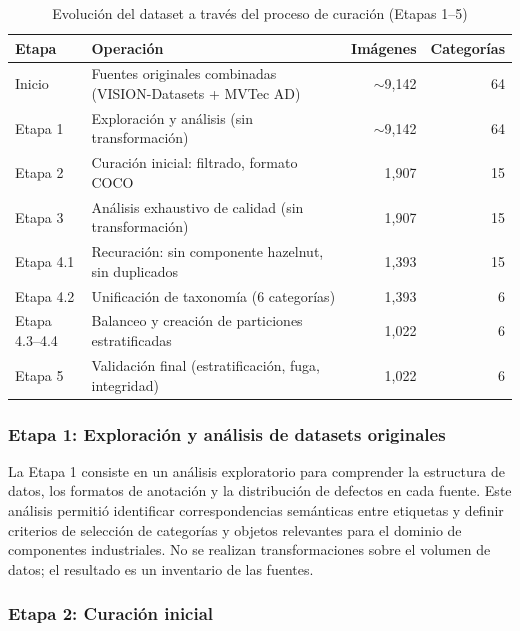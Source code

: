 \begin{table}[H]
\centering
\begin{tabularx}{\textwidth}{@{}l X r r@{}}
\toprule
\textbf{Etapa} & \textbf{Operación} & \textbf{Imágenes} & \textbf{Categorías} \\
\midrule
Inicio       & Fuentes originales combinadas (VISION-Datasets + MVTec AD)  & $\sim$9{,}142 & 64 \\
\midrule
Etapa 1      & Exploración y análisis (sin transformación)                  & $\sim$9{,}142 & 64 \\
Etapa 2      & Curación inicial: filtrado, formato COCO                     & 1{,}907 & 15 \\
Etapa 3      & Análisis exhaustivo de calidad (sin transformación)          & 1{,}907 & 15 \\
Etapa 4.1    & Recuración: sin componente hazelnut, sin duplicados          & 1{,}393 & 15 \\
Etapa 4.2    & Unificación de taxonomía (6 categorías)                      & 1{,}393 & 6  \\
Etapa 4.3--4.4 & Balanceo y creación de particiones estratificadas               & 1{,}022 & 6  \\
Etapa 5      & Validación final (estratificación, fuga, integridad)      & 1{,}022 & 6  \\
\bottomrule
\end{tabularx}
\caption{Evolución del dataset a través del proceso de curación (Etapas 1--5)}
\label{tab:evolucion_dataset_curacion}
\end{table}

\subsubsection{Etapa 1: Exploración y análisis de datasets originales}

La Etapa 1 consiste en un análisis exploratorio para comprender la estructura de datos, los formatos de anotación y la distribución de defectos en cada fuente. Este análisis permitió identificar correspondencias semánticas entre etiquetas y definir criterios de selección de categorías y objetos relevantes para el dominio de componentes industriales. No se realizan transformaciones sobre el volumen de datos; el resultado es un inventario de las fuentes.

\subsubsection{Etapa 2: Curación inicial}

